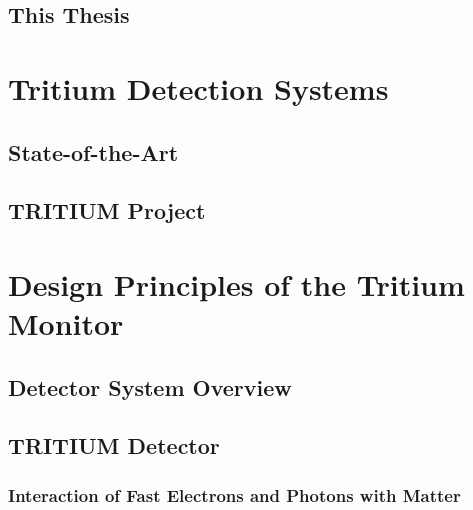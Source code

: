 \documentclass[12pt,a4paper]{book}
\begin{document}
	\section{This Thesis}\label{sec:ThisThesis}
	
	\newpage
	
\chapter{Tritium Detection Systems}\label{chap:TritiumDetection}
	
	\section{State-of-the-Art}\label{sec:StateOfTheArt}
	
	
	\section{TRITIUM Project}\label{sec:TritiumProject}
	
	\newpage	
	
\chapter[TRITIUM Design Principles]{Design Principles of the Tritium Monitor}\label{chap:DesignPrinciples}
	\section{Detector System Overview}\label{sec:MonitorOverview}
	 
	
	\section{TRITIUM Detector}\label{sec:TritiumDectectorIntro}
	 
	
		\subsection[Interaction of Particles with Matter]{Interaction of Fast Electrons and Photons with Matter}\label{subsec:Interaction}
		 
					
\end{document}

